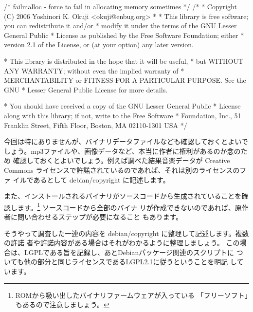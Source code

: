 \documentclass[mingoth,a4paper]{jsarticle}
\begin{document}
\begin{commandline}
/* failmalloc - force to fail in allocating memory sometimes */
/*
 * Copyright (C) 2006 Yoshinori K. Okuji <okuji@enbug.org>
 *
 * This library is free software; you can redistribute it and/or
 * modify it under the terms of the GNU Lesser General Public
 * License as published by the Free Software Foundation; either
 * version 2.1 of the License, or (at your option) any later version.

 * This library is distributed in the hope that it will be useful,
 * but WITHOUT ANY WARRANTY; without even the implied warranty of
 * MERCHANTABILITY or FITNESS FOR A PARTICULAR PURPOSE.  See the GNU
 * Lesser General Public License for more details.

 * You should have received a copy of the GNU Lesser General Public
 * License along with this library; if not, write to the Free Software
 * Foundation, Inc., 51 Franklin Street, Fifth Floor, Boston, MA  02110-1301  USA
*/
\end{commandline}

今回は特にありませんが、バイナリデータファイルなども確認しておくとよいで
しょう。mp3ファイルや、画像データなど、本当に作者に権利があるのか念のため
確認しておくとよいでしょう。例えば調べた結果音楽データが Creative
Commons ライセンスで許諾されているのであれば、それは別のライセンスのファ
イルであるとして debian/copyright に記述します。

また、インストールされるバイナリがソースコードから生成されていることを確
認します。\footnote{ROMから吸い出したバイナリファームウェアが入っている
「フリーソフト」もあるので注意しましょう。} ソースコードから全部のバイナ
リが作成できないのであれば、原作者に問い合わせるステップが必要になること
もあります。

そうやって調査した一連の内容を debian/copyright に整理して記述します。複数の許諾
者や許諾内容がある場合はそれがわかるように整理しましょう。
この場合は、LGPLである旨を記録し、あとDebianパッケージ関連のスクリプトに
ついても他の部分と同じライセンスであるLGPL2.1に従うということを明記
しています。
\end{document}
